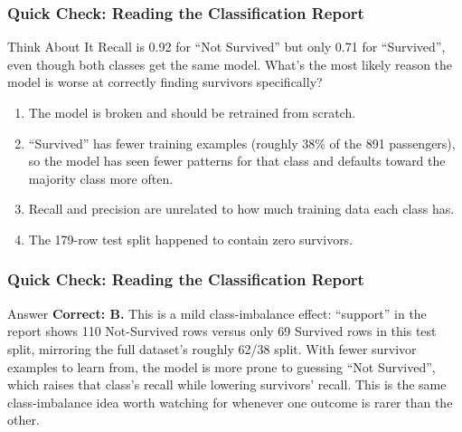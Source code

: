 \begin{frame}[fragile]\frametitle{Quick Check: Reading the Classification Report}
\begin{block}{Think About It}
Recall is 0.92 for ``Not Survived'' but only 0.71 for ``Survived'', even though both classes
get the same model. What's the most likely reason the model is worse at correctly finding
survivors specifically?
\begin{enumerate}
  \item[A.] The model is broken and should be retrained from scratch.
  \item[B.] ``Survived'' has fewer training examples (roughly 38\% of the 891 passengers), so
  the model has seen fewer patterns for that class and defaults toward the majority class
  more often.
  \item[C.] Recall and precision are unrelated to how much training data each class has.
  \item[D.] The 179-row test split happened to contain zero survivors.
\end{enumerate}
\end{block}
\end{frame}

\begin{frame}[fragile]\frametitle{Quick Check: Reading the Classification Report}
\begin{block}{Answer}
\textbf{Correct: B.} This is a mild class-imbalance effect: ``support'' in the report shows
110 Not-Survived rows versus only 69 Survived rows in this test split, mirroring the full
dataset's roughly 62/38 split. With fewer survivor examples to learn from, the model is more
prone to guessing ``Not Survived'', which raises that class's recall while lowering
survivors' recall. This is the same class-imbalance idea worth watching for whenever one
outcome is rarer than the other.
\end{block}
\end{frame}

